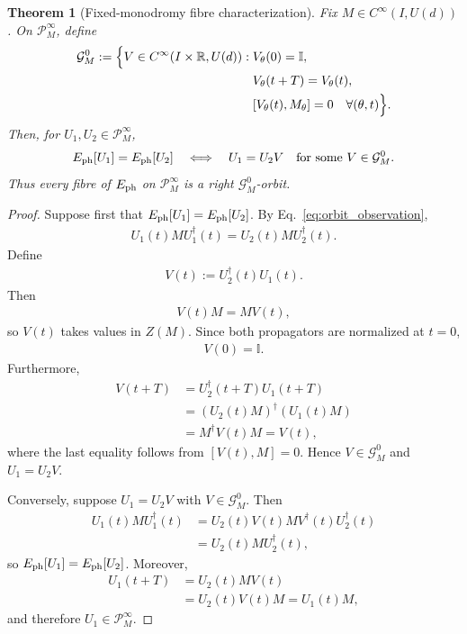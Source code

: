 \documentclass[twocolumn,prl,aps,floatfix]{revtex4-2}
\newtheorem{theorem}{Theorem}
\begin{document}
\begin{theorem}[Fixed-monodromy fibre characterization]
Fix $M\in C^\infty(I,U(d))$. On $\mathcal P_M^\infty$, define
\begin{align}
\mathcal G_M^0
:=
\Bigl\{
V\in C^\infty(I\times\mathbb R,U(d)):
&\;V_\theta(0)=\mathbb I,
\nonumber\\
&\;V_\theta(t+T)=V_\theta(t),
\nonumber\\
&\;[V_\theta(t),M_\theta]=0
\quad\forall(\theta,t)
\Bigr\}.
\label{eq:G_M}
\end{align}
Then, for $U_1,U_2\in\mathcal P_M^\infty$,
\begin{align}
E_{\rm ph}[U_1]=E_{\rm ph}[U_2]
\quad\Longleftrightarrow\quad
U_1=U_2V
\quad\text{for some }V\in\mathcal G_M^0.
\label{eq:fibre_characterization}
\end{align}
Thus every fibre of $E_{\rm ph}$ on $\mathcal P_M^\infty$ is a right $\mathcal G_M^0$-orbit.
\end{theorem}

\begin{proof}
Suppose first that
$E_{\rm ph}[U_1]=E_{\rm ph}[U_2]$. By Eq.~\eqref{eq:orbit_observation},
\begin{align}
U_1(t)MU_1^\dagger(t)
=
U_2(t)MU_2^\dagger(t).
\end{align}
Define
\begin{align}
V(t):=U_2^\dagger(t)U_1(t).
\end{align}
Then
\begin{align}
V(t)M
=
MV(t),
\end{align}
so $V(t)$ takes values in $Z(M)$. Since both propagators are normalized at $t=0$,
\begin{align}
V(0)=\mathbb I.
\end{align}
Furthermore,
\begin{align}
V(t+T)
&=
U_2^\dagger(t+T)U_1(t+T)
\nonumber\\
&=
(U_2(t)M)^\dagger(U_1(t)M)
\nonumber\\
&=
M^\dagger V(t)M
=
V(t),
\end{align}
where the last equality follows from $[V(t),M]=0$. Hence $V\in\mathcal G_M^0$ and $U_1=U_2V$.

Conversely, suppose $U_1=U_2V$ with $V\in\mathcal G_M^0$. Then
\begin{align}
U_1(t)MU_1^\dagger(t)
&=
U_2(t)V(t)MV^\dagger(t)U_2^\dagger(t)
\nonumber\\
&=
U_2(t)MU_2^\dagger(t),
\end{align}
so $E_{\rm ph}[U_1]=E_{\rm ph}[U_2]$. Moreover,
\begin{align}
U_1(t+T)
&=
U_2(t)MV(t)
\nonumber\\
&=
U_2(t)V(t)M
=
U_1(t)M,
\end{align}
and therefore $U_1\in\mathcal P_M^\infty$.
\end{proof}
\end{document}

